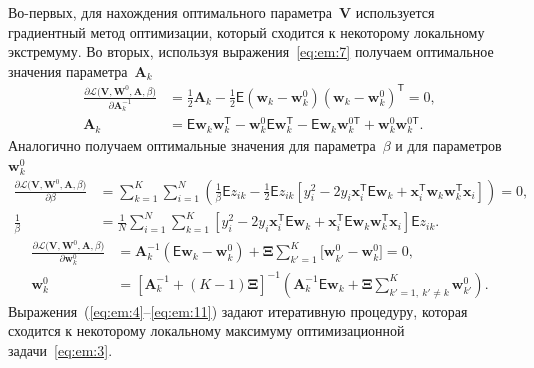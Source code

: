 Во-первых, для нахождения оптимального параметра~$\textbf{V}$ используется градиентный метод оптимизации, который сходится к некоторому локальному экстремуму.
Во вторых, используя выражения~\eqref{eq:em:7} получаем оптимальное значения параметра~$\textbf{A}_{k}$
\[
\label{eq:em:9}
\begin{aligned}
\frac{\partial \mathcal{L}\bigr(\textbf{V}, \textbf{W}^{0}, \textbf{A}, \beta\bigr)}{\partial \textbf{A}^{-1}_k} &=  \frac{1}{2}\textbf{A}_{k} - \frac{1}{2}\mathsf{E}\left(\textbf{w}_{k} - \textbf{w}_{k}^{0}\right)\left(\textbf{w}_{k} - \textbf{w}_{k}^{0}\right)^{\mathsf{T}} = 0,\\
\textbf{A}_{k} &= \mathsf{E}\textbf{w}_{k}\textbf{w}_{k}^{\mathsf{T}} - \textbf{w}_{k}^{0}\mathsf{E}\textbf{w}_{k}^{\mathsf{T}} - \mathsf{E}\textbf{w}_{k}\textbf{w}_{k}^{0\mathsf{T}} + \textbf{w}_{k}^{0}\textbf{w}_{k}^{0\mathsf{T}}.
\end{aligned}
\]
Аналогично получаем оптимальные значения для параметра~$\beta$ и для параметров~$\textbf{w}_{k}^{0}$
\[
\label{eq:em:10}
\begin{aligned}
\frac{\partial \mathcal{L}\bigr(\textbf{V}, \textbf{W}^{0}, \textbf{A}, \beta\bigr)}{\partial \beta} &= \sum_{k=1}^{K}\sum_{i=1}^{N}\left(\frac{1}{\beta}\mathsf{E}z_{ik}-\frac{1}{2}\mathsf{E}z_{ik}\left[y_{i}^{2}-2y_{i}\textbf{x}_{i}^{\mathsf{T}}\mathsf{E}\textbf{w}_{k}+\textbf{x}_{i}^{\mathsf{T}}\textbf{w}_{k}\textbf{w}_{k}^{\mathsf{T}}\textbf{x}_{i}\right]\right) = 0,\\
\frac{1}{\beta}&=\frac{1}{N}\sum_{i=1}^{N}\sum_{k=1}^{K}\left[y_{i}^{2}-2y_{i}\textbf{x}_{i}^{\mathsf{T}}\mathsf{E}\textbf{w}_{k} + \textbf{x}_{i}^{\mathsf{T}}\mathsf{E}\textbf{w}_{k}\textbf{w}_{k}^{\mathsf{T}}\textbf{x}_{i}\right]\mathsf{E}z_{ik}.
\end{aligned}
\]
\[
\label{eq:em:11}
\begin{aligned}
\frac{\partial \mathcal{L}\bigr(\textbf{V}, \textbf{W}^{0}, \textbf{A}, \beta\bigr)}{\partial \mathbf{w}_k^0} &= \mathbf{A}_k^{-1}\left(\mathsf{E}\mathbf{w}_k - \mathbf{w}_{k}^{0}\right) + \bm{\Xi}\sum_{k'=1}^{K}\bigr[\mathbf{w}_{k'}^{0} -\mathbf{w}_{k}^{0}\bigr] = 0,\\
\textbf{w}_{k}^{0} &=\left[\textbf{A}_{k}^{-1}+\left(K-1\right)\bm{\Xi}\right]^{-1}\left(\textbf{A}^{-1}_{k}\mathsf{E}\textbf{w}_{k}+\bm{\Xi}\sum_{k'=1,~k'\not=k}^{K}\textbf{w}_{k'}^{0}\right).
\end{aligned}
\]
Выражения~(\ref{eq:em:4}--\ref{eq:em:11}) задают итеративную процедуру, которая сходится к некоторому локальному максимуму оптимизационной задачи~\eqref{eq:em:3}.

